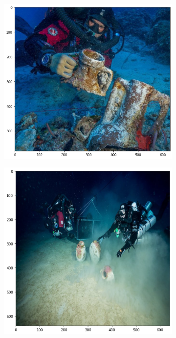 \documentclass[a4paper, 11pt, oneside]{article}
\begin{document}
\begin{figure}[ht]
\begin{subfigure}[ht]{0.4\textwidth}
        \includegraphics[width=\textwidth]{val_3.png}
    \end{subfigure}
    \begin{subfigure}[ht]{0.4\textwidth}
      \centering
      \includegraphics[width=\textwidth]{val_2.png}
    \end{subfigure}

\end{figure}
\end{document}
